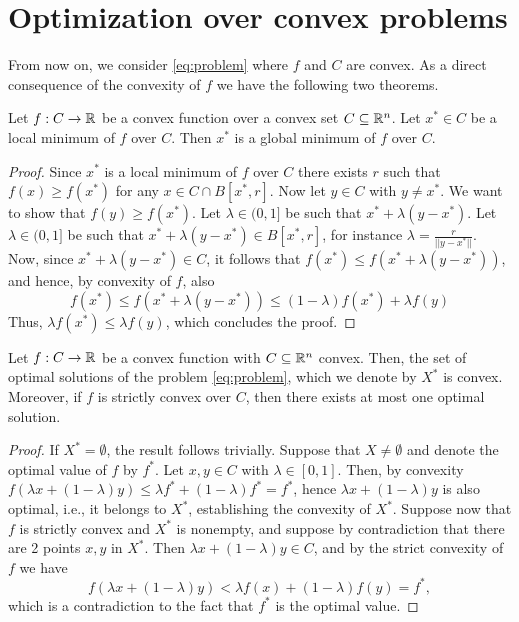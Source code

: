 \documentclass[10pt,a4paper]{article}
\begin{document}
\section{Optimization over convex problems}
From now on, we consider \eqref{eq:problem} where $f$ and $C$ are convex. As a direct consequence of the convexity of $f$ we have the following two theorems.
\begin{theorem}[global=local in convex optimization] Let $f:C\to\mathbb{R}$ be a convex function over a convex set $C\subseteq \mathbb{R}^n$. Let $x^*\in C$ be a local minimum of $f$ over $C$. Then $x^*$ is a global minimum of $f$ over $C$.	
\end{theorem}
\begin{proof}
	Since $x^*$ is a local minimum of $f$ over $C$ there exists $r$ such that $f(x)\geq f(x^*)$ for any $x\in C \cap B[x^*,r]$. Now let $y\in C$ with $y\neq x^*$. We want to show that $f(y) \geq f(x^*)$. Let $\lambda\in(0,1]$ be such that $x^*+\lambda (y-x^*)$. Let $\lambda\in(0,1]$ be such that $x^*+\lambda(y-x^*)\in B[x^*,r]$, for instance $\lambda=\frac{r}{||y-x^*||}$. Now, since $x^*+\lambda (y-x^*) \in C$, it follows that $f(x^*)\leq f(x^*+\lambda (y-x^*))$, and hence, by convexity of $f$, also 
	\begin{equation*}
		f(x^*)\leq f(x^*+\lambda (y-x^*)) \leq (1-\lambda)f(x^*) +\lambda f(y)
	\end{equation*}
Thus, $\lambda f(x^*) \leq \lambda f(y)$, which concludes the proof.
\end{proof}
\begin{theorem}
	Let $f:C\to \mathbb{R}$ be a convex function with $C\subseteq \mathbb{R}^n$ convex. Then, the set of optimal solutions of the problem \eqref{eq:problem}, which we denote by $X^*$ is convex. Moreover, if $f$ is strictly convex over $C$, then there exists at most one optimal solution.
\end{theorem}
\begin{proof}
	If $X^*=\emptyset$, the result follows trivially. Suppose that $X\neq\emptyset$ and denote the optimal value of $f$ by $f^*$. Let $x,y\in C$ with $\lambda\in[0,1]$. Then, by convexity $f(\lambda x+(1-\lambda)y)\leq \lambda f^* +(1-\lambda)f^*= f^*$, hence $\lambda x +(1-\lambda)y$ is also optimal, i.e., it belongs to $X^*$, establishing the convexity of $X^*$. Suppose now that $f$ is strictly convex and $X^*$ is nonempty, and suppose by contradiction that there are 2 points $x,y$ in $X^*$. Then $\lambda x +(1-\lambda)y \in C$, and by the strict convexity of $f$ we have 
	\begin{equation*}
		f(\lambda x +(1-\lambda) y) < \lambda f(x) + (1-\lambda) f(y) = f^*,
	\end{equation*}
which is a contradiction to the fact that $f^*$ is the optimal value.
\end{proof}
\end{document}
